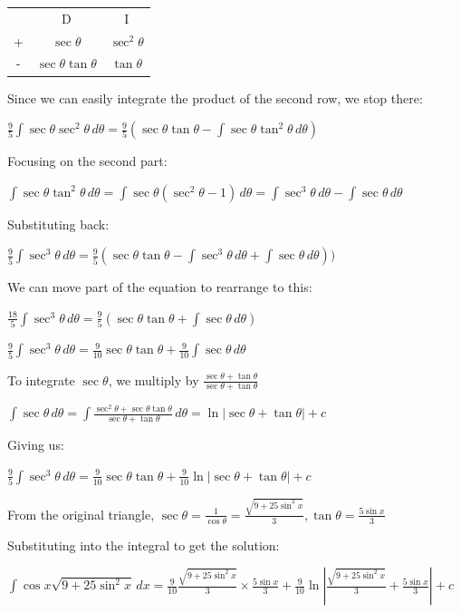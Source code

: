 \documentclass[../main.tex]{subfiles}
\begin{document}
\begin{enumerate}
    \begin{tabular}{ c c c }
       & D & I \\ 
     +  & $\sec{\theta}$ &$\sec^2{\theta}$ \\  
     - & $\sec{\theta}\tan{\theta}$ & $\tan{\theta}$\\ 
    \end{tabular}

    Since we can easily integrate the product of the second row, we stop there:

    \(\frac{9}{5}\int \sec{\theta}\sec^2{\theta}\,d\theta=\frac{9}{5}(\sec{\theta}\tan{\theta}-\int \sec{\theta}\tan^2{\theta}\,d\theta)\)

    Focusing on the second part:

    \(\int \sec{\theta}\tan^2{\theta}\,d\theta=\int \sec{\theta}(\sec^2{\theta}-1)\,d\theta=\int \sec^3{\theta}\,d\theta -\int \sec{\theta}\,d\theta\)

    Substituting back:

    \(\frac{9}{5}\int \sec^3{\theta}\,d\theta=\frac{9}{5}(\sec{\theta}\tan{\theta}-\int \sec^3{\theta}\,d\theta +\int \sec{\theta}\,d\theta))\)

    We can move part of the equation to rearrange to this:

    \(\frac{18}{5}\int \sec^3{\theta}\,d\theta=\frac{9}{5}(\sec{\theta}\tan{\theta} +\int \sec{\theta}\,d\theta)\)

    \(\frac{9}{5}\int \sec^3{\theta}\,d\theta=\frac{9}{10}\sec{\theta}\tan{\theta} +\frac{9}{10}\int \sec{\theta}\,d\theta\)

    To integrate \(\sec{\theta}\), we multiply by \(\frac{\sec{\theta}+\tan{\theta}}{\sec{\theta}+\tan{\theta}}\)

    \(\int \sec{\theta}\,d\theta=\int \frac{\sec^2{\theta}+\sec{\theta}\tan{\theta}}{\sec{\theta}+\tan{\theta}}\,d\theta=\ln{|\sec{\theta}+\tan{\theta}|}+c\)

    Giving us:

    \(\frac{9}{5}\int \sec^3{\theta}\,d\theta=\frac{9}{10}\sec{\theta}\tan{\theta}+\frac{9}{10}\ln{|\sec{\theta}+\tan{\theta}|}+c\)

    From the original triangle, \(\sec{\theta}=\frac{1}{\cos{\theta}}=\frac{\sqrt{9+25\sin^2{x}}}{3}, \tan{\theta}=\frac{5\sin{x}}{3}\)

    Substituting into the integral to get the solution:

    \(\int \cos{x}\sqrt{9+25\sin^2{x}}\,dx=\frac{9}{10}\frac{\sqrt{9+25\sin^2{x}}}{3}\times \frac{5\sin{x}}{3}+\frac{9}{10}\ln{|\frac{\sqrt{9+25\sin^2{x}}}{3}+\frac{5\sin{x}}{3}|+c}\)


\end{enumerate}
\end{document}
